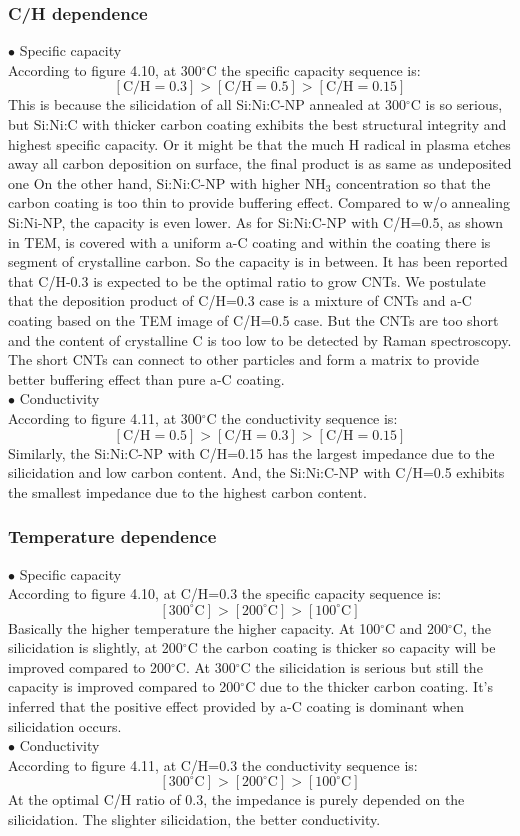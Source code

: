 \subsubsection{C/H dependence}
\noindent $\bullet$ Specific capacity\\
According to figure 4.10, at 300\(^\circ\)C the specific capacity sequence is: 
$$\mathrm{[C/H=0.3] > [C/H=0.5] > [C/H=0.15]}$$
This is because the silicidation of  all Si:Ni:C-NP annealed at 300\(^\circ\)C is so serious, but Si:Ni:C with thicker carbon coating exhibits the best structural integrity and highest specific capacity. Or it might be that the much H radical in plasma etches away all carbon deposition on surface, the final product is as same as undeposited one  On the other hand, Si:Ni:C-NP with higher $\mathrm{NH_{3}}$ concentration so that the carbon coating is too thin to provide buffering effect. Compared to w/o annealing Si:Ni-NP, the capacity is even lower. As for Si:Ni:C-NP with C/H=0.5, as shown in TEM, is covered with a uniform a-C coating and within the coating there is segment of crystalline carbon. So the capacity is in between. It has been reported that C/H-0.3 is expected to be the optimal ratio to grow CNTs. We postulate that the deposition product of C/H=0.3 case is a mixture of CNTs and a-C coating based on the TEM image of C/H=0.5 case. But the CNTs are too short and the content of crystalline C is too low to be detected by Raman spectroscopy. The short CNTs can connect to other particles and form a matrix to provide better buffering effect than pure a-C coating.\\
\noindent $\bullet$ Conductivity\\
According to figure 4.11, at 300\(^\circ\)C the conductivity sequence is: 
$$\mathrm{[C/H=0.5] > [C/H=0.3] > [C/H=0.15]}$$
Similarly, the Si:Ni:C-NP with C/H=0.15 has the largest impedance due to the silicidation and low carbon content. And, the Si:Ni:C-NP with C/H=0.5 exhibits the smallest impedance due to the highest carbon content.
\subsubsection{Temperature dependence}
\noindent $\bullet$ Specific capacity\\
According to figure 4.10, at C/H=0.3 the specific capacity sequence is: 
$$\mathrm{[300^{\circ}C]> [200^{\circ}C] > [100^{\circ}C]}$$
Basically the higher temperature the higher capacity. At 100\(^\circ\)C and 200\(^\circ\)C, the silicidation is slightly, at 200\(^\circ\)C the carbon coating is thicker so capacity will be improved compared to 200\(^\circ\)C. At 300\(^\circ\)C the silicidation is serious but still the capacity is improved compared to 200\(^\circ\)C due to the thicker carbon coating. It's inferred that the positive effect provided by a-C coating is dominant when silicidation occurs. \\
\noindent $\bullet$ Conductivity\\
According to figure 4.11, at C/H=0.3 the conductivity sequence is: 
$$\mathrm{[300^{\circ}C]> [200^{\circ}C] > [100^{\circ}C]}$$
At the optimal C/H ratio of 0.3, the impedance is purely depended on the silicidation.
The slighter silicidation, the better conductivity.
